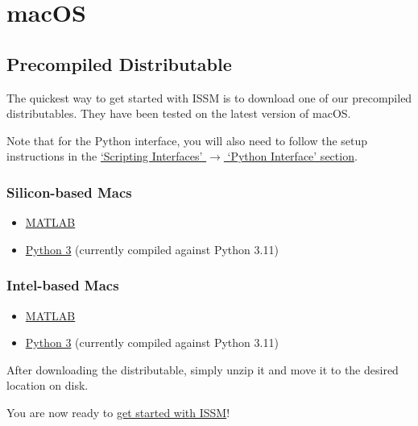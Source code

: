 
\section{macOS} \label{sec:installation-macos}
\subsection{Precompiled Distributable}
The quickest way to get started with ISSM is to download one of our precompiled distributables. They have been tested on the latest version of macOS.

Note that for the Python interface, you will also need to follow the setup instructions in the \hyperref[sec:macos-python-interface]{`Scripting Interfaces' $\rightarrow$ `Python Interface' section}.

\subsubsection{Silicon-based Macs}
\begin{itemize}
	\item \href{https://ross.ics.uci.edu/ISSM-macOS-Silicon-MATLAB.zip}{MATLAB}
	\item \href{https://ross.ics.uci.edu/ISSM-macOS-Silicon-Python-3.zip}{Python 3} (currently compiled against Python 3.11)
\end{itemize}

\subsubsection{Intel-based Macs}
\begin{itemize}
	\item \href{https://ross.ics.uci.edu/ISSM-macOS-Intel-MATLAB.zip}{MATLAB}
	\item \href{https://ross.ics.uci.edu/ISSM-macOS-Intel-Python-3.zip}{Python 3} (currently compiled against Python 3.11)
\end{itemize}

After downloading the distributable, simply unzip it and move it to the desired location on disk.

You are now ready to 
\hyperref[chap:getting-started]{get started with ISSM}!

